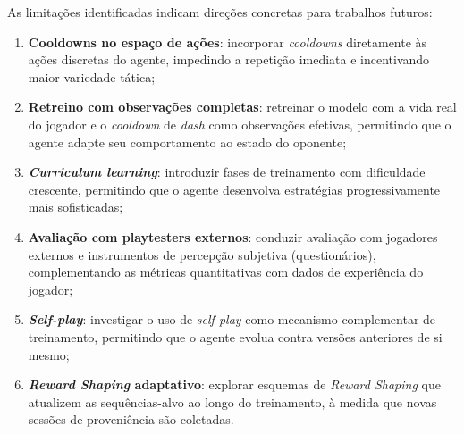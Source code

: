 As limitações identificadas indicam direções concretas para trabalhos futuros:

\begin{enumerate}
    \item \textbf{Cooldowns no espaço de ações}: incorporar
          \textit{cooldowns} diretamente às ações discretas do agente,
          impedindo a repetição imediata e incentivando maior variedade
          tática;
    \item \textbf{Retreino com observações completas}: retreinar o modelo
          com a vida real do jogador e o \textit{cooldown} de \textit{dash}
          como observações efetivas, permitindo que o agente adapte seu
          comportamento ao estado do oponente;
    \item \textbf{\textit{Curriculum learning}}: introduzir fases de
          treinamento com dificuldade crescente, permitindo que o agente
          desenvolva estratégias progressivamente mais sofisticadas;
    \item \textbf{Avaliação com playtesters externos}: conduzir avaliação
          com jogadores externos e instrumentos de percepção subjetiva
          (questionários), complementando as métricas quantitativas com
          dados de experiência do jogador;
    \item \textbf{\textit{Self-play}}: investigar o uso de \textit{self-play}
          como mecanismo complementar de treinamento, permitindo que o agente
          evolua contra versões anteriores de si mesmo;
    \item \textbf{\textit{Reward Shaping} adaptativo}: explorar esquemas de
          \textit{Reward Shaping} que atualizem as sequências-alvo ao longo
          do treinamento, à medida que novas sessões de proveniência são
          coletadas.
\end{enumerate}
